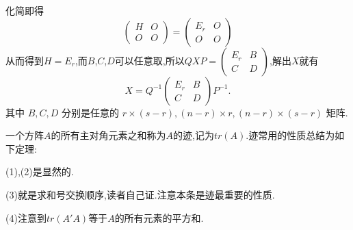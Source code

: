 \documentclass{article}
\begin{document}
化简即得
\begin{equation*}
    \left(\begin{array}{ll}
        H & O \\
        O & O
    \end{array}\right)=\left(\begin{array}{cc}
        E_{r} & O \\
        O     & O
    \end{array}\right)
\end{equation*}
从而得到$H = E_r$,而$B$,$C$,$D$可以任意取,所以$Q X P = \left(
    \begin{array}{cc}
            E_r & B \\
            C   & D
        \end{array}
    \right)$,解出$X$就有
\begin{equation*}
    X=Q^{-1}\left(\begin{array}{cc}
            E_{r} & B \\
            C     & D
        \end{array}\right) P^{-1}.
\end{equation*}
其中 $B, C, D$ 分别是任意的 $r \times(s-r),(n-r) \times r,(n-r) \times(s-r)$ 矩阵.

\vspace{1ex}

\vspace{2ex}
\vspace{2ex}

一个方阵$A$的所有主对角元素之和称为$A$的迹,记为$t r \left(A\right)$.迹常用的性质总结为如下定理:


 (1),(2)是显然的.

(3)就是求和号交换顺序,读者自己证.注意本条是迹最重要的性质.

(4)注意到$tr \left(A'A\right)$等于$A$的所有元素的平方和.
\end{document}
